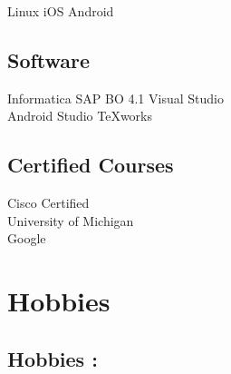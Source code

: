 \documentclass[a4paper]{deedy-resume} %
\begin{document}
\begin{minipage}[t]{0.33\textwidth}
Linux \textbullet{} iOS \textbullet{} Android \textbullet{}
\sectionspace
\subsection{Software}
Informatica \textbullet{} SAP BO 4.1 \textbullet{} Visual Studio\\  Android Studio 
\textbullet{} TeXworks

\sectionspace
\subsection{Certified Courses}
 \textbullet{} Cisco Certified\\
 \textbullet{} University of Michigan\\
 \textbullet{} Google 
\sectionspace %

\section{Hobbies}
\subsection{Hobbies : }

 \textbullet{} 

 \textbullet{} 

 \textbullet{} 

 \textbullet{} 


\sectionspace %

\end{minipage} %
\hfill
%
%
\end{document}
